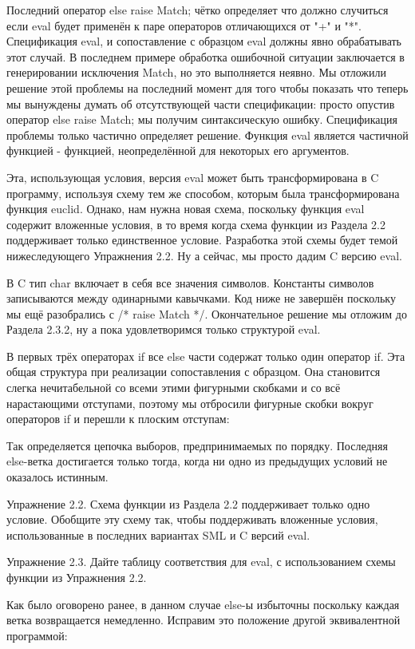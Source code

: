 Последний оператор else raise Match; чётко определяет что должно случиться если eval будет применён к паре операторов отличающихся от "+" и "*". Спецификация eval, и сопоставление с образцом eval должны явно обрабатывать этот случай. В последнем примере обработка ошибочной ситуации заключается в генерировании исключения Match, но это выполняется неявно. Мы отложили решение этой проблемы на последний момент для того чтобы показать что теперь мы вынуждены думать об отсутствующей части спецификации: просто опустив оператор else raise Match; мы получим синтаксическую ошибку. Спецификация проблемы только частично определяет решение. Функция eval является частичной функцией - функцией, неопределённой для некоторых его аргументов.

Эта, использующая условия, версия eval может быть трансформирована в C программу, используя схему тем же способом, которым была трансформирована функция euclid. Однако, нам нужна новая схема, поскольку функция eval содержит вложенные условия, в то время когда схема функции из Раздела 2.2 поддерживает только единственное условие. Разработка этой схемы будет темой нижеследующего Упражнения 2.2. Ну а сейчас, мы просто дадим C версию eval.

В C тип char включает в себя все значения символов. Константы символов записываются между одинарными кавычками. Код ниже не завершён поскольку мы ещё разобрались с /* raise Match */. Окончательное решение мы отложим до Раздела 2.3.2, ну а пока удовлетворимся только структурой eval.

В первых трёх операторах if все else части содержат только один оператор if. Эта общая структура при реализации сопоставления с образцом. Она становится слегка нечитабельной со всеми этими фигурными скобками и со всё нарастающими отступами, поэтому мы отбросили фигурные скобки вокруг операторов if и перешли к плоским отступам:

Так определяется цепочка выборов, предпринимаемых по порядку. Последняя else-ветка достигается только тогда, когда ни одно из предыдущих условий не оказалось истинным.

Упражнение 2.2. Схема функции из Раздела 2.2 поддерживает только одно условие. Обобщите эту схему так, чтобы поддерживать вложенные условия, использованные в последних вариантах SML и C версий eval.

Упражнение 2.3. Дайте таблицу соответствия для eval, с использованием схемы функции из Упражнения 2.2.

Как было оговорено ранее, в данном случае else-ы избыточны поскольку каждая ветка возвращается немедленно. Исправим это положение другой эквивалентной программой:


